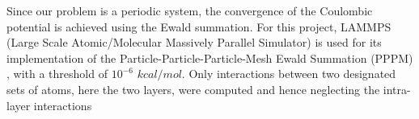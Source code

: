 Since our problem is a periodic system, the convergence of the Coulombic potential is achieved using the Ewald summation\cite{lee_ewald_nodate}. For this project, LAMMPS (Large Scale Atomic/Molecular Massively Parallel Simulator)\cite{plimpton_fast_nodate} is used for its implementation of the Particle-Particle-Particle-Mesh Ewald Summation (PPPM) \cite{hockney_computer_1981} , with a threshold of $10^{-6}$ $kcal/mol$.
Only interactions between two designated sets of atoms, here the two layers, were computed and hence neglecting the intra-layer interactions


